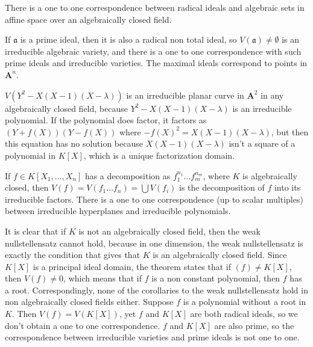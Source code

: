 \begin{corollary}
    There is a one to one correspondence between radical ideals and algebraic sets in affine space over an algebraically closed field.
\end{corollary}

\begin{corollary}
    If $\mathfrak{a}$ is a prime ideal, then it is also a radical non total ideal, so $V(\mathfrak{a}) \neq \emptyset$ is an irreducible algebraic variety, and there is a one to one correspondence with such prime ideals and irreducible varieties. The maximal ideals correspond to points in $\mathbf{A}^n$.
\end{corollary}

\begin{example}
    $V(Y^2 - X(X-1)(X-\lambda))$ is an irreducible planar curve in $\mathbf{A}^2$ in any algebraically closed field, because $Y^2 - X(X-1)(X-\lambda)$ is an irreducible polynomial. If the polynomial does factor, it factors as $(Y + f(X))(Y - f(X))$ where $-f(X)^2 = X(X-1)(X-\lambda)$, but then this equation has no solution because $X(X-1)(X-\lambda)$ isn't a square of a polynomial in $K[X]$, which is a unique factorization domain.
\end{example}

\begin{corollary}
    If $f \in K[X_1, \dots, X_n]$ has a decomposition as $f_1^{n_1} \dots f_m^{n_m}$, where $K$ is algebraically closed, then $V(f) = V(f_1 \dots f_n) = \bigcup V(f_i)$ is the decomposition of $f$ into its irreducible factors. There is a one to one correspondence (up to scalar multiples) between irreducible hyperplanes and irreducible polynomials.
\end{corollary}

It is clear that if $K$ is not an algebraically closed field, then the weak nullstellensatz cannot hold, because in one dimension, the weak nullstellensatz is exactly the condition that gives that $K$ is an algebraically closed field. Since $K[X]$ is a principal ideal domain, the theorem states that if $(f) \neq K[X]$, then $V(f) \neq 0$, which means that if $f$ is a non constant polynomial, then $f$ has a root. Correspondingly, none of the corollaries to the weak nullstellensatz hold in non algebraically closed fields either. Suppose $f$ is a polynomial without a root in $K$. Then $V(f) = V(K[X])$, yet $f$ and $K[X]$ are both radical ideals, so we don't obtain a one to one correspondence. $f$ and $K[X]$ are also prime, so the correspondence between irreducible varieties and prime ideals is not one to one.

